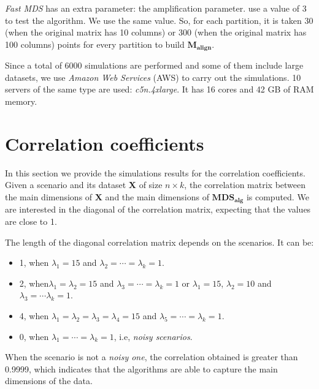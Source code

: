 \documentclass[11pt]{report}
\begin{document}
\indent \textit{Fast MDS} has an extra parameter: the amplification parameter.
 use a value of 3 to test the algorithm. 
We use the same value. So, for each partition, it is taken 30 
(when the original matrix has 10 columns) or 300 (when the original matrix 
has 100 columns) points for every partition to build $\mathbf{M_{align}}$.

\indent Since a total of 6000 simulations are performed and some of them 
include large datasets, we use \textit{Amazon Web Services} (AWS) to carry out 
the simulations. 10 servers of the same type are used: \textit{c5n.4xlarge}. It 
has 16 cores and 42 GB of RAM memory.

\section{Correlation coefficients}
In this section we provide the simulations results for the correlation 
coefficients. Given a scenario and its dataset \textbf{X} of size $n \times k$, 
the correlation matrix between the main dimensions of \textbf{X} and 
the main dimensions of $\mathbf{MDS_{alg}}$ is computed. We are 
interested in the diagonal of the correlation matrix, expecting that 
the values are close to 1. 

\indent The length of the diagonal correlation matrix depends on the scenarios.
It can be:

\begin{itemize}
\item 1, when  $\lambda_1 = 15$ and $\lambda_2 = \cdots = \lambda_k = 1$.

\item 2, when$\lambda_1  = \lambda_2 = 15$ and 
$\lambda_3 = \cdots = \lambda_k = 1$
or $\lambda_1  = 15$, $\lambda_2 =10$ and $\lambda_3 = \cdots \lambda_k = 1$.

\item 4, when $\lambda_1  = \lambda_2 = \lambda_3 = \lambda_4 = 15$ and 
$\lambda_5 = \cdots = \lambda_k = 1$.

\item 0, when $\lambda_1 = \cdots = \lambda_k = 1$, i.e, 
\textit{noisy scenarios}.

\end{itemize}


\indent When the scenario is not a \textit{noisy one}, the correlation obtained
is greater than 0.9999, which indicates that the algorithms are able to 
capture the main dimensions of the data. 
\end{document}
